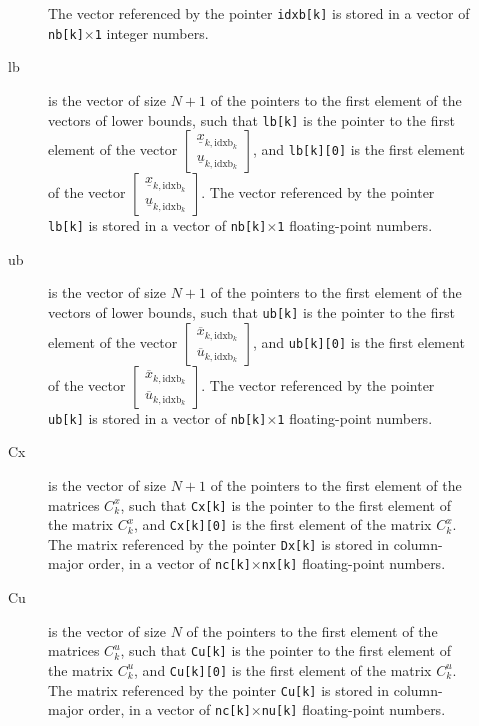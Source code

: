 \documentclass{report}
\begin{document}
\begin{description}
\begin{description}
		The vector referenced by the pointer \texttt{idxb[k]} is stored in a vector of \texttt{nb[k]$\times$1} integer numbers.
		\item[lb] is the vector of size $N+1$ of the pointers to the first element of the vectors of lower bounds, such that \texttt{lb[k]} is the pointer to the first element of the vector $\begin{bmatrix} \underline x_{k, \mathrm{idxb}_k} \\ \underline u_{k, \mathrm{idxb}_k} \end{bmatrix}$, and \texttt{lb[k][0]} is the first element of the vector $\begin{bmatrix} \underline x_{k, \mathrm{idxb}_k} \\ \underline u_{k, \mathrm{idxb}_k} \end{bmatrix}$.
		The vector referenced by the pointer \texttt{lb[k]} is stored in a vector of \texttt{nb[k]$\times$1} floating-point numbers.
		\item[ub] is the vector of size $N+1$ of the pointers to the first element of the vectors of lower bounds, such that \texttt{ub[k]} is the pointer to the first element of the vector $\begin{bmatrix} \overline x_{k, \mathrm{idxb}_k} \\ \overline u_{k, \mathrm{idxb}_k} \end{bmatrix}$, and \texttt{ub[k][0]} is the first element of the vector $\begin{bmatrix} \overline x_{k, \mathrm{idxb}_k} \\ \overline u_{k, \mathrm{idxb}_k} \end{bmatrix}$.
		The vector referenced by the pointer \texttt{ub[k]} is stored in a vector of \texttt{nb[k]$\times$1} floating-point numbers.
		\item[Cx] is the vector of size $N+1$ of the pointers to the first element of the matrices $C^x_k$, such that \texttt{Cx[k]} is the pointer to the first element of the matrix $C^x_k$, and \texttt{Cx[k][0]} is the first element of the matrix $C^x_k$.
		The matrix referenced by the pointer \texttt{Dx[k]} is stored in column-major order, in a vector of \texttt{nc[k]$\times$nx[k]} floating-point numbers.
		\item[Cu] is the vector of size $N$ of the pointers to the first element of the matrices $C^u_k$, such that \texttt{Cu[k]} is the pointer to the first element of the matrix $C^u_k$, and \texttt{Cu[k][0]} is the first element of the matrix $C^u_k$.
		The matrix referenced by the pointer \texttt{Cu[k]} is stored in column-major order, in a vector of \texttt{nc[k]$\times$nu[k]} floating-point numbers.

\end{description}
\end{description}
\end{document}
